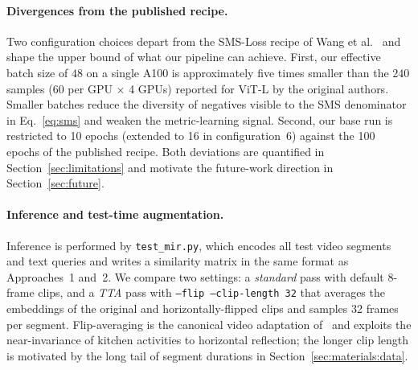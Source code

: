 \paragraph{Divergences from the published recipe.}
Two configuration choices depart from the SMS-Loss recipe of Wang et al.~\cite{wang2024symmetricmultisimilaritylossepickitchens100} and shape the upper bound of what our pipeline can achieve. First, our effective batch size of $48$ on a single A100 is approximately five times smaller than the $240$ samples (60 per GPU $\times$ 4 GPUs) reported for ViT-L by the original authors. Smaller batches reduce the diversity of negatives visible to the SMS denominator in Eq.~\eqref{eq:sms} and weaken the metric-learning signal. Second, our base run is restricted to 10 epochs (extended to 16 in configuration~6) against the 100 epochs of the published recipe. Both deviations are quantified in Section~\ref{sec:limitations} and motivate the future-work direction in Section~\ref{sec:future}.

\paragraph{Inference and test-time augmentation.}
Inference is performed by \texttt{test\_mir.py}, which encodes all test video segments and text queries and writes a similarity matrix in the same format as Approaches~1 and~2. We compare two settings: a \emph{standard} pass with default 8-frame clips, and a \emph{TTA} pass with \texttt{--flip --clip-length 32} that averages the embeddings of the original and horizontally-flipped clips and samples 32 frames per segment. Flip-averaging is the canonical video adaptation of~\cite{krizhevsky2012alexnet} and exploits the near-invariance of kitchen activities to horizontal reflection; the longer clip length is motivated by the long tail of segment durations in Section~\ref{sec:materials:data}.
